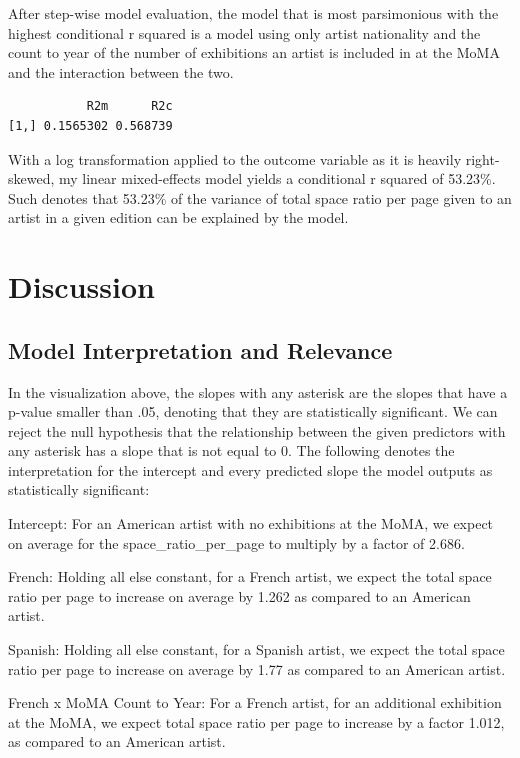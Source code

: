 \documentclass[
  letterpaper,
  DIV=11,
  numbers=noendperiod]{scrreprt}
\begin{document}
After step-wise model evaluation, the model that is most parsimonious
with the highest conditional r squared is a model using only artist
nationality and the count to year of the number of exhibitions an artist
is included in at the MoMA and the interaction between the two.

\begin{verbatim}
           R2m      R2c
[1,] 0.1565302 0.568739
\end{verbatim}

With a log transformation applied to the outcome variable as it is
heavily right-skewed, my linear mixed-effects model yields a conditional
r squared of 53.23\%. Such denotes that 53.23\% of the variance of total
space ratio per page given to an artist in a given edition can be
explained by the model.

\hypertarget{discussion}{%
\chapter{Discussion}\label{discussion}}

\hypertarget{model-interpretation-and-relevance}{%
\section{Model Interpretation and
Relevance}\label{model-interpretation-and-relevance}}

In the visualization above, the slopes with any asterisk are the slopes
that have a p-value smaller than .05, denoting that they are
statistically significant. We can reject the null hypothesis that the
relationship between the given predictors with any asterisk has a slope
that is not equal to 0. The following denotes the interpretation for the
intercept and every predicted slope the model outputs as statistically
significant:

Intercept: For an American artist with no exhibitions at the MoMA, we
expect on average for the space\_ratio\_per\_page to multiply by a
factor of 2.686.

French: Holding all else constant, for a French artist, we expect the
total space ratio per page to increase on average by 1.262 as compared
to an American artist.

Spanish: Holding all else constant, for a Spanish artist, we expect the
total space ratio per page to increase on average by 1.77 as compared to
an American artist.

French x MoMA Count to Year: For a French artist, for an additional
exhibition at the MoMA, we expect total space ratio per page to increase
by a factor 1.012, as compared to an American artist.
\end{document}
